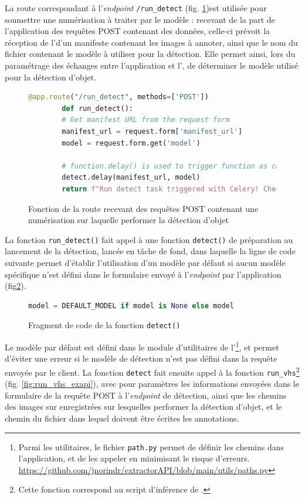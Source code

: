	La route correspondant à l'\textit{endpoint} \texttt{/run\_detect} (fig. \ref{fig:run_detect_exapi})est utilisée pour soumettre une numérisation à traiter par le modèle : recevant de la part de l'application des requêtes \http POST contenant des données, celle-ci prévoit la réception de l'\URL d'un manifeste \iiif contenant les images à annoter, ainsi que le nom du fichier contenant le modèle à utiliser pour la détection. Elle permet ainsi, lors du paramétrage des échanges entre l'application et l'\api, de déterminer le modèle utilisé pour la détection d'objet.
	
	\begin{figure}[h]
		\begin{lstlisting}[language=Python]
		@app.route("/run_detect", methods=['POST'])
		def run_detect():
		# Get manifest URL from the request form
		manifest_url = request.form['manifest_url']
		model = request.form.get('model')
		
		# function.delay() is used to trigger function as celery task
		detect.delay(manifest_url, model)
		return f"Run detect task triggered with Celery! Check terminal to see the logs..."\end{lstlisting}
		\caption{Fonction de la route recevant des requêtes POST contenant une numérisation sur laquelle performer la détection d'objet}
		\label{fig:run_detect_exapi}
	\end{figure}

	La fonction \texttt{run\_detect()} fait appel à une fonction \texttt{detect()} de préparation au lancement de la détection, lancée en tâche de fond, dans laquelle la ligne de code suivante permet d'établir l'utilisation d'un modèle par défaut si aucun modèle spécifique n'est défini dans le formulaire envoyé à l'\textit{endpoint} par l'application (fig\ref{fig:model_exapi}).
	
	\begin{figure}[h]
		\begin{lstlisting}[language=Python]
		model = DEFAULT_MODEL if model is None else model\end{lstlisting}
		\caption{Fragment de code de la fonction \texttt{detect()}}
		\label{fig:model_exapi}
	\end{figure}

	Le modèle par défaut est défini dans le module d'utilitaires de l'\api\footnote{Parmi les utilitaires, le fichier \texttt{path.py} permet de définir les chemins dans l'application, et de les appeler en minimisant le risque d'erreurs. \url{https://github.com/jnorindr/extractorAPI/blob/main/utils/paths.py}}, et permet d'éviter une erreur si le modèle de détection n'est pas défini dans la requête envoyée par le client. La fonction \texttt{detect} fait ensuite appel à la fonction \texttt{run\_vhs}\footnote{Cette fonction correspond au script d'inférence de \yolov.} (fig. \ref{fig:run_vhs_exapi}), avec pour paramètres les informations envoyées dans le formulaire de la requête POST à l'\textit{endpoint} de détection, ainsi que les chemins des images sur enregistrées sur lesquelles performer la détection d'objet, et le chemin du fichier dans lequel doivent être écrites les annotations.
	
